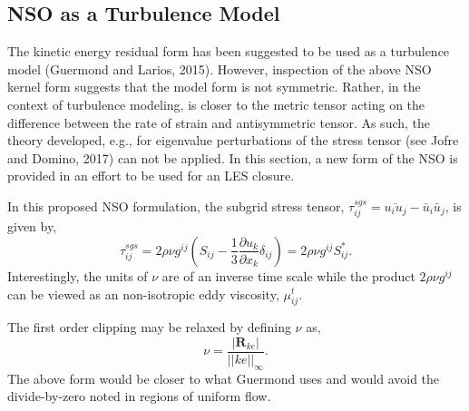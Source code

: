 \subsection{NSO as a Turbulence Model}
The kinetic energy residual form has been suggested to be used as a turbulence model (Guermond and Larios, 2015). However,
inspection of the above NSO kernel form suggests that the model form is not symmetric. Rather, in the context of
turbulence modeling, is closer to the metric tensor acting on the difference between the rate of strain and antisymmetric
tensor. As such, the theory developed, e.g., for eigenvalue perturbations of the stress tensor (see Jofre and Domino, 2017) can not be applied. In this section,
a new form of the NSO is provided in an effort to be used for an LES closure.

In this proposed NSO formulation, the subgrid stress tensor, $\tau^{sgs}_{ij} = \overline{u_i u_j} - \bar u_i \bar u_j$, 
is given by,
\begin{equation}
  \tau^{sgs}_{ij} = 2 \rho \nu g^{ij} (S_{ij} - \frac{1}{3}\frac{\partial u_k} {\partial x_k} \delta_{ij}) 
                = 2 \rho \nu g^{ij} S^*_{ij}.
\label{nsoTurbForm}
\end{equation}
Interestingly, the units of $\nu$ are of an inverse time scale while the product $2 \rho \nu g^{ij}$ can be viewed
as an non-isotropic eddy viscosity, $\mu^t_{ij}$.

The first order clipping may be relaxed by defining $\nu$ as,
\begin{equation}
  \nu = \frac{| \mathbf{R}_{ke} |} {||ke||_\infty}.
\label{nuTurb}
\end{equation}
The above form would be closer to what Guermond uses and would avoid the divide-by-zero noted in regions of uniform flow.




